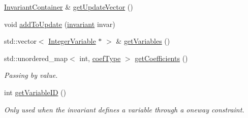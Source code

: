 \begin{DoxyCompactItemize}
\item 
\hyperlink{_constants_8hpp_a5ea9d0c2efe357d2a7f5bcd80cdf179a}{Invariant\-Container} \& \hyperlink{class_invariant_a8bafd08ffb19446230d2c53ac5694e83}{get\-Update\-Vector} ()
\item 
void \hyperlink{class_invariant_af74c12c8720d388fc0897587d1c1d91c}{add\-To\-Update} (\hyperlink{_constants_8hpp_ac9b562f250a09412c017b68185321eba}{invariant} invar)
\item 
std\-::vector$<$ \hyperlink{class_integer_variable}{Integer\-Variable} $\ast$ $>$ \& \hyperlink{class_invariant_a09053cbce110bc98986bab0cbf03f322}{get\-Variables} ()
\item 
std\-::unordered\-\_\-map$<$ int, \hyperlink{_constants_8hpp_a08c47c54ab9fb1545c341ec853cc2278}{coef\-Type} $>$ \hyperlink{class_invariant_a35361b85223cf640130f903b795e7d9f}{get\-Coefficients} ()
\begin{DoxyCompactList}\small\item\em Passing by value. \end{DoxyCompactList}\item 
int \hyperlink{class_invariant_adc8d7a742f61131108e8be28fc7b7398}{get\-Variable\-I\-D} ()
\begin{DoxyCompactList}\small\item\em Only used when the invariant defines a variable through a oneway constraint. \end{DoxyCompactList}\end{DoxyCompactItemize}
